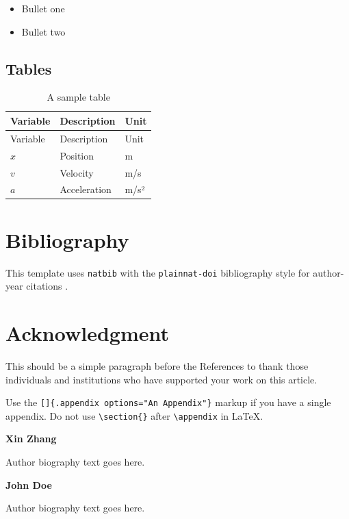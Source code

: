 \documentclass[
  11pt,
]{article}
\providecommand{\tightlist}{%
  \setlength{\itemsep}{0pt}\setlength{\parskip}{0pt}}
\theoremstyle{plain}
\theoremstyle{plain}
\theoremstyle{plain}
\theoremstyle{definition}
\theoremstyle{remark}
\begin{document}
\begin{itemize}
\tightlist
\item
  Bullet one
\item
  Bullet two
\end{itemize}

\subsection{Tables}\label{tables}

\begin{longtable}[]{@{}lll@{}}
\caption{A sample table}\label{tbl-sample}\tabularnewline
\toprule\noalign{}
Variable & Description & Unit \\
\midrule\noalign{}
\endfirsthead
\toprule\noalign{}
Variable & Description & Unit \\
\midrule\noalign{}
\endhead
\bottomrule\noalign{}
\endlastfoot
\(x\) & Position & m \\
\(v\) & Velocity & m/s \\
\(a\) & Acceleration & m/s² \\
\end{longtable}

\section{Bibliography}\label{bibliography}

This template uses \texttt{natbib} with the \texttt{plainnat-doi}
bibliography style for author-year citations
\citet{karatzas1991brownian}.

\section*{Acknowledgment}\label{acknowledgment}

This should be a simple paragraph before the References to thank those
individuals and institutions who have supported your work on this
article.

{}

Use the \texttt{{[}{]}\{.appendix\ options="An\ Appendix"\}} markup if
you have a single appendix. Do not use
\texttt{\textbackslash{}section\{\}} after
\texttt{\textbackslash{}appendix} in LaTeX.

\renewcommand\refname{References}



\vspace*{18pt}
\noindent\textbf{Xin Zhang}\par

Author biography text goes here.\par
\vspace*{18pt}
\noindent\textbf{John Doe}\par

Author biography text goes here.\par
\end{document}
